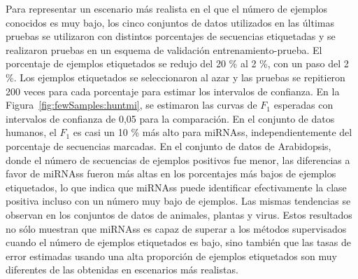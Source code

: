Para representar un escenario más realista en el que el número de ejemplos conocidos es muy bajo, los cinco conjuntos de datos utilizados en las últimas pruebas
se utilizaron con distintos porcentajes de secuencias etiquetadas y se realizaron pruebas en un esquema de validación entrenamiento-prueba. El porcentaje de
ejemplos etiquetados se redujo del 20 \% al 2 \%, con un paso del 2 \%. Los ejemplos etiquetados se seleccionaron al azar y las pruebas se repitieron 200 veces
para cada porcentaje para estimar los intervalos de confianza. En la Figura~\ref{fig:fewSamples:huntmi}, se estimaron las curvas de $F_{1}$ esperadas con
intervalos de confianza de 0,05 para la comparación. En el conjunto de datos humanos, el $F_{1}$ es casi un 10 \% más alto para miRNAss, independientemente del
porcentaje de secuencias marcadas. En el conjunto de datos de Arabidopsis, donde el número de secuencias de ejemplos positivos fue menor, las diferencias a
favor de miRNAss fueron más altas en los porcentajes más bajos de ejemplos etiquetados, lo que indica que miRNAss puede identificar efectivamente la clase
positiva incluso con un número muy bajo de ejemplos. Las mismas tendencias se observan en los conjuntos de datos de animales, plantas y virus. Estos resultados
no sólo muestran que miRNAss es capaz de superar a los métodos supervisados cuando el número de ejemplos etiquetados es bajo, sino también que las tasas de
error estimadas usando una alta proporción de ejemplos etiquetados son muy diferentes de las obtenidas en escenarios más realistas.

